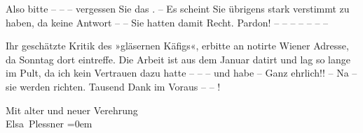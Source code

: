 \pstart
            Also bitte – – – vergessen Sie das \label{K_L03732-4v}\label{K_L03732-4}. – Es scheint Sie
               übrigens stark verstimmt zu haben, da keine Antwort – – Sie hatten damit Recht.
               Pardon! – – – – – – –\pend
           
\pstart
           Ihr geschätzte Kritik des »gläsernen Käfigs«,
               erbitte an notirte Wiener Adresse, da
                  Sonntag dort eintreffe. Die Arbeit ist aus dem Januar datirt und lag so
               lange im Pult, da ich kein Vertrauen dazu hatte – – – und habe – Ganz ehrlich!! – Na
               – sie werden richten. Tausend Dank im Voraus – – !\pend
           
\pstart
           Mit alter und neuer Verehrung{\\[\baselineskip]}\spacefill\mbox{Elsa Plessner}\pend
           \leftskip=0em{}\endnumbering{}
\begin{anhang}
\end{anhang}
      
